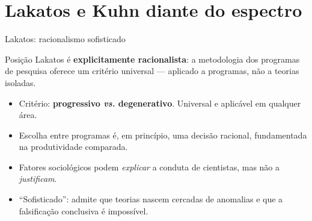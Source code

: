\documentclass[aspectratio=169]{beamer}
\newcommand{\impt}[1]{\textcolor{maccent}{\textbf{#1}}}
\newcommand{\ntc}[1]{\textcolor{mprimary}{#1}}
\begin{document}
\section{Lakatos e Kuhn diante do espectro}

\begin{frame}{Lakatos: racionalismo sofisticado}
\begin{block}{Posi\c c\~ao}
Lakatos \'e \impt{explicitamente racionalista}: a metodologia dos programas de pesquisa oferece um crit\'erio universal --- aplicado a programas, n\~ao a teorias isoladas.
\end{block}
\vspace{0.3cm}
\begin{itemize}
    \item Crit\'erio: \impt{progressivo \emph{vs.} degenerativo}. Universal e aplic\'avel em qualquer \'area.
    \item Escolha entre programas \'e, em princ\'ipio, uma decis\~ao \ntc{racional}, fundamentada na produtividade comparada.
    \item Fatores sociol\'ogicos podem \emph{explicar} a conduta de cientistas, mas n\~ao a \emph{justificam}.
\end{itemize}
\vspace{0.2cm}
\begin{itemize}
    \item \ntc{``Sofisticado''}: admite que teorias nascem cercadas de anomalias e que a falsifica\c c\~ao conclusiva \'e imposs\'ivel.
\end{itemize}
\end{frame}
\end{document}
